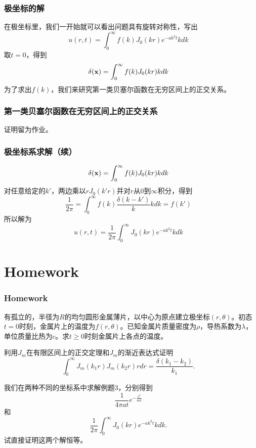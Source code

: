 \documentclass[CJK]{beamer}
\begin{document}
\begin{frame}
  \frametitle{极坐标的解}
  
  在极坐标里，我们一开始就可以看出问题具有旋转对称性，写出
  $$  u(r, t) = \int_0^\infty f(k) J_0(kr)e^{-ak^2t} k dk $$
  取$t=0$，得到
  $$  \delta({\mathbf{x}}) = \int_0^\infty f(k) J_0(kr) k dk $$  
  为了求出$f(k)$，我们来研究第一类贝塞尔函数在无穷区间上的正交关系。
  
\end{frame}


\begin{frame}
  \frametitle{第一类贝塞尔函数在无穷区间上的正交关系}
  
  证明留为作业。
  
\end{frame}


\begin{frame}
  \frametitle{极坐标系求解（续）}
  
  $$  \delta({\mathbf{x}}) = \int_0^\infty f(k) J_0(kr)k dk $$
  对任意给定的$k'$，两边乘以$rJ_0(k'r)$并对$r$从$0$到$\infty$积分，得到
  $$ \frac{1}{2\pi} = \int_0^\infty f(k)\frac{\delta(k-k')}{k} k dk =f(k')$$
  所以解为
  $$  u(r, t) = \frac{1}{2\pi} \int_0^\infty J_0(kr)e^{-ak^2t} k dk $$  
  
\end{frame}



\section{Homework}

\begin{frame}
  \frametitle{Homework}
  
  \bitem
\item{  有孤立的，半径为$R$的均匀圆形金属薄片，以中心为原点建立极坐标$(r,\theta)$。初态$t=0$时刻，金属片上的温度为$f(r,\theta)$。已知金属片质量密度为$\rho$，导热系数为$\lambda$，单位质量比热为$c$。求$t\ge 0$时刻金属片上各点的温度。}
\item{利用$J_m$在有限区间上的正交定理和$J_m$的渐近表达式证明
  $$ \int_0^\infty J_m(k_1r)J_m(k_2r) r dr = \frac{\delta(k_1-k_2)}{k_1}. $$ }
\item{  
  我们在两种不同的坐标系中求解例题3，分别得到
  $$\frac{1}{4\pi at}e^{-\frac{r^2}{4at}}$$
  和
  $$ \frac{1}{2\pi} \int_0^\infty J_0(kr)e^{-ak^2t} k dk.$$
  试直接证明这两个解恒等。}
  \eitem
  
\end{frame}

\ech
\end{document}
